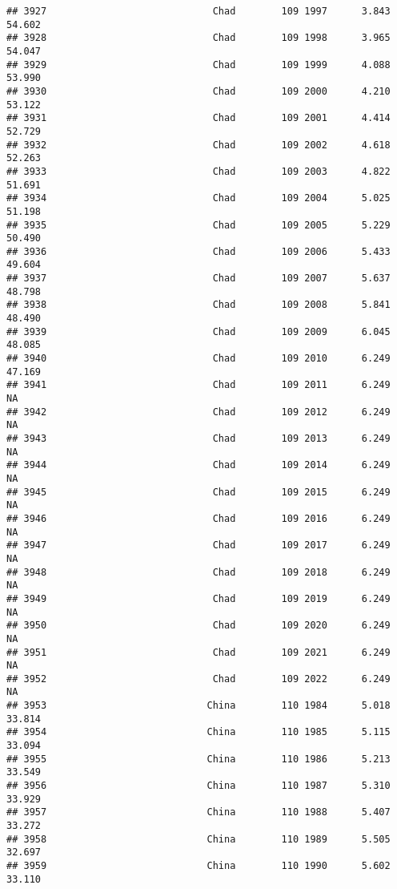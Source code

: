 \documentclass[
]{article}
\begin{document}
\begin{verbatim}
## 3927                             Chad        109 1997      3.843     54.602
## 3928                             Chad        109 1998      3.965     54.047
## 3929                             Chad        109 1999      4.088     53.990
## 3930                             Chad        109 2000      4.210     53.122
## 3931                             Chad        109 2001      4.414     52.729
## 3932                             Chad        109 2002      4.618     52.263
## 3933                             Chad        109 2003      4.822     51.691
## 3934                             Chad        109 2004      5.025     51.198
## 3935                             Chad        109 2005      5.229     50.490
## 3936                             Chad        109 2006      5.433     49.604
## 3937                             Chad        109 2007      5.637     48.798
## 3938                             Chad        109 2008      5.841     48.490
## 3939                             Chad        109 2009      6.045     48.085
## 3940                             Chad        109 2010      6.249     47.169
## 3941                             Chad        109 2011      6.249         NA
## 3942                             Chad        109 2012      6.249         NA
## 3943                             Chad        109 2013      6.249         NA
## 3944                             Chad        109 2014      6.249         NA
## 3945                             Chad        109 2015      6.249         NA
## 3946                             Chad        109 2016      6.249         NA
## 3947                             Chad        109 2017      6.249         NA
## 3948                             Chad        109 2018      6.249         NA
## 3949                             Chad        109 2019      6.249         NA
## 3950                             Chad        109 2020      6.249         NA
## 3951                             Chad        109 2021      6.249         NA
## 3952                             Chad        109 2022      6.249         NA
## 3953                            China        110 1984      5.018     33.814
## 3954                            China        110 1985      5.115     33.094
## 3955                            China        110 1986      5.213     33.549
## 3956                            China        110 1987      5.310     33.929
## 3957                            China        110 1988      5.407     33.272
## 3958                            China        110 1989      5.505     32.697
## 3959                            China        110 1990      5.602     33.110

\end{verbatim}
\end{document}
